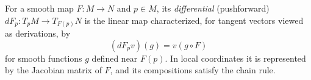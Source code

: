 
For a smooth map $F:M\to N$ and $p\in M$, its \emph{differential} (pushforward) $dF_p:T_pM\to T_{F(p)}N$ is the linear map characterized, for tangent vectors viewed as derivations, by
\[
(dF_pv)(g)=v(g\circ F)
\]
for smooth functions $g$ defined near $F(p)$. In local coordinates it is represented by the Jacobian matrix of $F$, and its compositions satisfy the chain rule.
